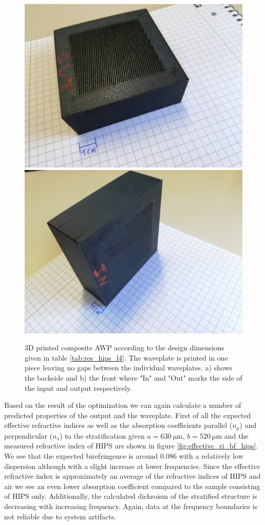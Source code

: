 \begin{figure}[H]
    \centering
    \subcaptionbox{\label{fig:sent2david_1}}
        {\includegraphics[width=0.47\linewidth]{images/results/polymer/sent2david_1.jpg}}
    \subcaptionbox{\label{fig:sent2david_2}}
        {\includegraphics[width=0.47\linewidth]{images/results/polymer/sent2david_2.jpg}}
    \caption{3D printed composite AWP according to the design dimensions given in table \ref{tab:res_hips_l4}. The waveplate is printed in one piece leaving no gaps between the individual waveplates. a) shows the backside and b) the front where "In" and "Out" marks the side of the input and output respectively.}
    \label{fig:sent2david}
\end{figure}

Based on the result of the optimization we can again calculate a number of predicted properties of the output and the waveplate. First of all the expected effective refractive indices as well as the absorption coefficients parallel ($n_p$) and perpendicular ($n_s$) to the stratification given $a=\SI{630}{\micro \meter}$, $b=\SI{520}{\micro \meter}$ and the measured refractive index of HIPS are shown in figure \ref{fig:effective_ri_bf_hips}. We see that the expected birefringence is around $0.086$ with a relatively low dispersion although with a slight increase at lower frequencies. Since the effective refractive index is approximately an average of the refractive indices of HIPS and air we see an even lower absorption coefficient compared to the sample consisting of HIPS only. Additionally, the calculated dichroism of the stratified structure is decreasing with increasing frequency. Again, data at the frequency boundaries is not reliable due to system artifacts.

